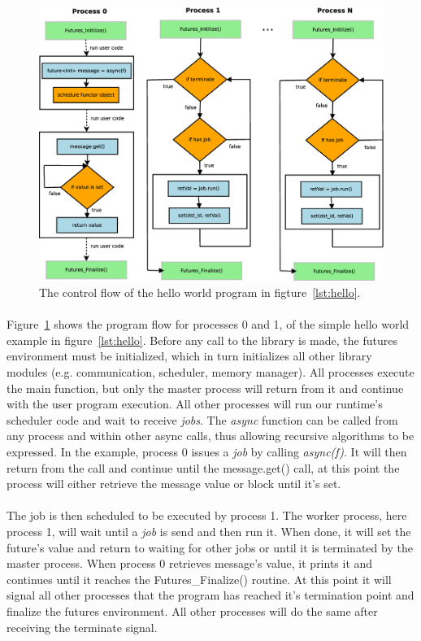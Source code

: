 \begin{figure}[!ht]
\includegraphics[width=\columnwidth]{figures/hello_flow}
\caption{
The control flow of the hello world program in figture~\ref{lst:hello}.}
\label{fig:helloCF}
\end{figure}

\paragraph{}
Figure~\ref{fig:helloCF} shows the program flow for processes 0 and 1, of the simple
hello world example in figure~\ref{lst:hello}.  Before any call to the library is made, the futures
environment must be initialized, which in turn initializes all other library modules 
(e.g. communication, scheduler, memory manager).
All processes execute the main function, but only
the master process will return from it and continue with the user program execution.
All other processes will run our runtime's scheduler code and wait to receive \emph{jobs}.
The \emph{async} function can be called from any process 
and within other async calls, thus allowing recursive algorithms to be expressed. 
In the example, process 0 issues a \emph{job} by
calling \emph{async(f)}.  It will then return from the call and continue until
the message.get() call, at this point the process will either retrieve the message value or block until
it's set.

\paragraph{}
The job is then scheduled to be executed by process 1.  The worker process,
here process 1, will wait until a \emph{job} is send and then run it.  When done, it will set 
the future's value and return to waiting for other jobs or until it is terminated by the master
process.  When process 0 retrieves message's value, it prints it and continues until it reaches
the Futures\_Finalize() routine.  At this point it will signal all other processes that the program
has reached it's termination point and finalize the futures environment.  All other processes will
do the same after receiving the terminate signal.

